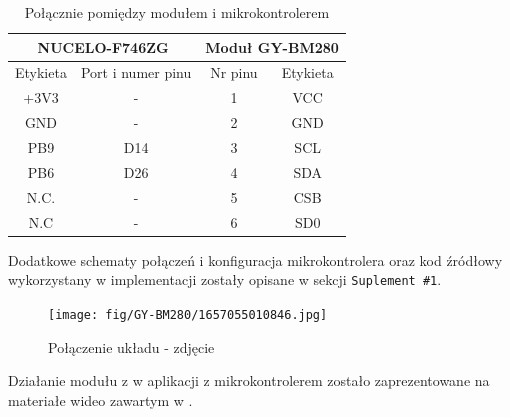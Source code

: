 \documentclass[11pt, a4paper]{article}
\begin{document}
\vspace{0.5cm}
\begin{table}[h!]
    \centering
    \begin{tabular}{|c|c|c|c|} 
        \hline
        \multicolumn{2}{|c|}{NUCELO-F746ZG} & \multicolumn{2}{c|}{Moduł GY-BM280}  \\ 
        \hline
        Etykieta    &   Port i numer pinu   &   Nr pinu &   Etykieta    \\ \hline
        +3V3    &   -   &   1   &   VCC \\  \hline
        GND     &   -   &   2   &   GND \\  \hline
        PB9     &   D14 &   3   &   SCL \\  \hline
        PB6     &   D26 &   4   &   SDA \\  \hline
        N.C.    &   -   &   5   &   CSB \\  \hline
        N.C     &   -   &   6   &   SD0 \\  \hline
    \end{tabular}
    \caption{Połącznie pomiędzy modułem i mikrokontrolerem}
    \label{tab:tab1}
\end{table}

Dodatkowe schematy połączeń i konfiguracja mikrokontrolera oraz kod źródłowy wykorzystany w implementacji zostały
opisane w sekcji \texttt{Suplement \#1}.

\begin{figure}[h]
    \centering
    \texttt{[image: fig/GY-BM280/1657055010846.jpg]}
    \caption{Połączenie układu - zdjęcie}
    \label{fig:polaczenie_ukladu}
\end{figure}
\vspace{0.5cm}
Działanie modułu z w aplikacji z mikrokontrolerem zostało zaprezentowane na materiałe wideo zawartym w \texttt{\cite{yt1}}.

\newpage
\printbibliography[heading=bibintoc]
\end{document}
